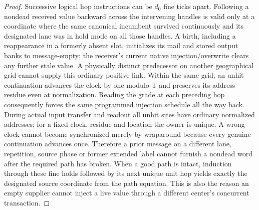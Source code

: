 \begin{proof}
Successive logical hop instructions can be \(d_0\) fine ticks apart. Following a nondead received value backward across the intervening handles is valid only at a coordinate where the same canonical incumbent survived continuously and its designated lane was in hold mode on all those handles. A birth, including a reappearance in a formerly absent slot, initializes its mail and stored output banks to message-empty; the receiver's current native injection/overwrite clears any further stale value. A physically distinct predecessor on another geographical grid cannot supply this ordinary positive link. Within the same grid, an unhit continuation advances the clock by one modulo T and preserves its address residue even at normalization. Reading the grade at each preceding hop consequently forces the same programmed injection schedule all the way back. During actual input transfer and readout all unhit sites have ordinary normalized addresses; for a fixed clock, residue and location the owner is unique. A wrong clock cannot become synchronized merely by wraparound because every genuine continuation advances once. Therefore a prior message on a different lane, repetition, source phase or former extended label cannot furnish a nondead word after the required path has broken. When a good path is intact, induction through these fine holds followed by its next unique unit hop yields exactly the designated source coordinate from the path equation. This is also the reason an empty supplier cannot inject a live value through a different center's concurrent transaction.
\end{proof}

